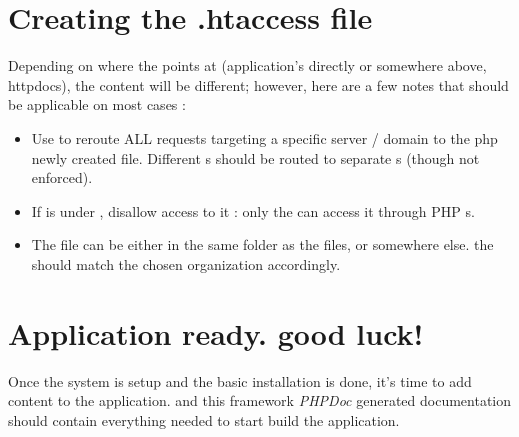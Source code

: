 \documentclass[pdftex,12pt,a4paper]{article}
\begin{document}
\section{Creating the .htaccess file}

Depending on where the  points at (application's  directly or somewhere above, \eg httpdocs), the content
will be different; however, here are a few notes that should be applicable on most cases :
\begin{itemize}
    \item Use  to reroute ALL requests targeting a specific server / domain to the php newly created  file.
    Different s should be routed to separate s (though not enforced).
    \item If  is under , disallow access to it : only the  can access it through PHP s.
    \item The  file can be either in the same folder as the  files, or somewhere else.
    the  should match the chosen organization accordingly.
\end{itemize}


\section{Application ready. good luck!}

Once the system is setup and the basic installation is done, it's time to add content to the application.
 and this framework \emph{PHPDoc} generated documentation should contain everything needed to start build the application.

\cleardoublepage

\printindex

\eod
\end{document}
